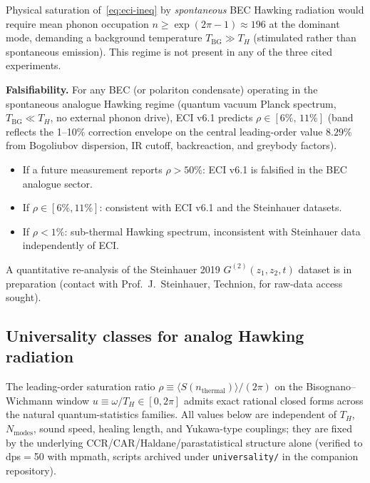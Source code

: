 \documentclass[reprint,amsmath,amssymb,aps,prd,superscriptaddress]{revtex4-2}
\providecommand{\1}{\mathbf{1}}
\begin{document}
Physical saturation of~\eqref{eq:eci-ineq} by \emph{spontaneous} BEC Hawking radiation
would require mean phonon occupation $n \geq \exp(2\pi-1) \approx 196$ at the dominant mode,
demanding a background temperature $T_\mathrm{BG} \gg T_H$ (stimulated rather than spontaneous
emission). This regime is not present in any of the three cited experiments.

\medskip\noindent\textbf{Falsifiability.}
For any BEC (or polariton condensate) operating in the spontaneous analogue Hawking regime
(quantum vacuum Planck spectrum, $T_\mathrm{BG} \ll T_H$, no external phonon drive),
ECI v6.1 predicts $\rho \in [6\%,\, 11\%]$ (band reflects the 1--10\% correction envelope on
the central leading-order value $8.29\%$ from Bogoliubov dispersion, IR cutoff, backreaction,
and greybody factors).
\begin{itemize}
  \item If a future measurement reports $\rho > 50\%$: ECI v6.1 is falsified in the BEC analogue sector.
  \item If $\rho \in [6\%,11\%]$: consistent with ECI v6.1 and the Steinhauer datasets.
  \item If $\rho < 1\%$: sub-thermal Hawking spectrum, inconsistent with Steinhauer data
        independently of ECI.
\end{itemize}
A quantitative re-analysis of the Steinhauer 2019 $G^{(2)}(z_1,z_2,t)$ dataset is in
preparation (contact with Prof.\ J.\ Steinhauer, Technion, for raw-data access sought).

\subsection{Universality classes for analog Hawking radiation}\label{sec:universality}

The leading-order saturation ratio $\rho \equiv \langle S(n_\mathrm{thermal})\rangle/(2\pi)$
on the Bisognano--Wichmann window $u \equiv \omega/T_H \in [0,2\pi]$ admits exact rational
closed forms across the natural quantum-statistics families. All values below are independent
of $T_H$, $N_\mathrm{modes}$, sound speed, healing length, and Yukawa-type couplings; they are
fixed by the underlying CCR/CAR/Haldane/parastatistical structure alone (verified to dps$=$50
with mpmath, scripts archived under \texttt{universality/} in the companion repository).
\end{document}

